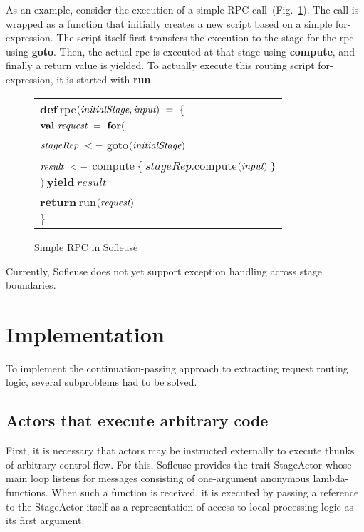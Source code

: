 \documentclass{sig-alternate}
\begin{document}
As an example, consider the execution of a simple RPC call~(Fig.~\ref{fig:rpc}).  The call is wrapped
as a function that initially creates a new script based on a simple for-expression. The script
itself first transfers the execution to the stage for the rpc using \textbf{goto}. Then, the actual 
rpc is executed at that stage using \textbf{compute}, and finally a return value is yielded.  
To actually execute this routing script for-expression, it is started with \textbf{run}.

\begin{figure}
\centering    
\begin{tabular}{l}           
$\textbf{def}\ $rpc$(\emph{initialStage}, \emph{input})\ =\ \{$\\	
\hspace{2ex} $\textbf{val}\ \emph{request}\ =\ \textbf{for} ($\\
\hspace{6ex} $\emph{stageRep}\ <-\ $goto$(\emph{initialStage})$\\
\hspace{6ex} $\emph{result}\ <-\ $compute$\ \{\ stageRep.$compute$(\emph{input})\ \}$\\
\hspace{2ex} $)\ \textbf{yield}\ result$\\
\hspace{2ex} $\textbf{return}\ $run$(\emph{request})$\\   
$\}$\\
\end{tabular}
\caption{Simple RPC in Sofleuse\label{fig:rpc}}
\end{figure}

Currently, Sofleuse does not yet support exception handling across stage boundaries.
                                                                                

\section{Implementation}
            
To implement the continuation-passing approach to extracting request routing logic, several 
subproblems had to be solved.

\subsection{Actors that execute arbitrary code} 

First, it is necessary that actors may be instructed externally to execute thunks of arbitrary
control flow. For this, Sofleuse provides the trait StageActor whose main loop listens for messages
consisting of one-argument anonymous lambda-functions. When such a function is received, it is
executed by passing a reference to the StageActor itself as a representation of access to local
processing logic as its first argument.
\end{document}
